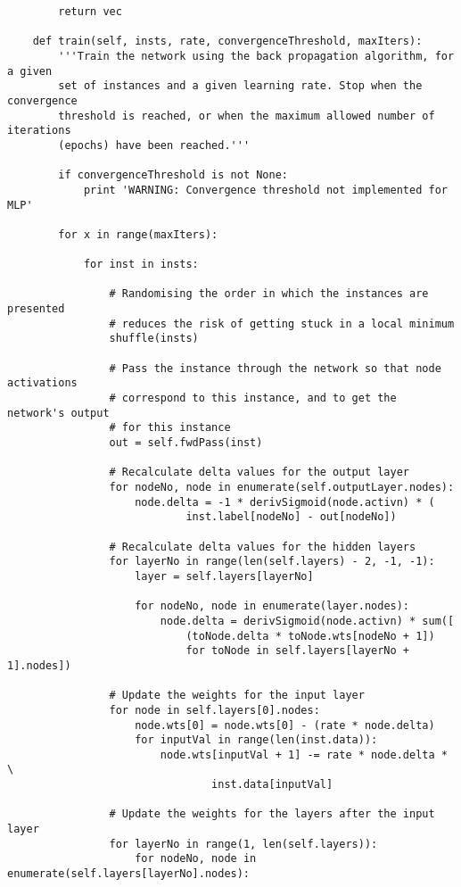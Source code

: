\documentclass{article}
\begin{document}
\begin{verbatim}
        return vec

    def train(self, insts, rate, convergenceThreshold, maxIters):
        '''Train the network using the back propagation algorithm, for a given
        set of instances and a given learning rate. Stop when the convergence
        threshold is reached, or when the maximum allowed number of iterations
        (epochs) have been reached.'''

        if convergenceThreshold is not None:
            print 'WARNING: Convergence threshold not implemented for MLP'

        for x in range(maxIters):
            
            for inst in insts:
                
                # Randomising the order in which the instances are presented 
                # reduces the risk of getting stuck in a local minimum
                shuffle(insts)

                # Pass the instance through the network so that node activations
                # correspond to this instance, and to get the network's output
                # for this instance
                out = self.fwdPass(inst)

                # Recalculate delta values for the output layer
                for nodeNo, node in enumerate(self.outputLayer.nodes):
                    node.delta = -1 * derivSigmoid(node.activn) * (
                            inst.label[nodeNo] - out[nodeNo])

                # Recalculate delta values for the hidden layers
                for layerNo in range(len(self.layers) - 2, -1, -1):
                    layer = self.layers[layerNo]

                    for nodeNo, node in enumerate(layer.nodes):
                        node.delta = derivSigmoid(node.activn) * sum([
                            (toNode.delta * toNode.wts[nodeNo + 1])
                            for toNode in self.layers[layerNo + 1].nodes])

                # Update the weights for the input layer
                for node in self.layers[0].nodes:
                    node.wts[0] = node.wts[0] - (rate * node.delta)
                    for inputVal in range(len(inst.data)):
                        node.wts[inputVal + 1] -= rate * node.delta * \
                                inst.data[inputVal]

                # Update the weights for the layers after the input layer
                for layerNo in range(1, len(self.layers)):
                    for nodeNo, node in enumerate(self.layers[layerNo].nodes):


\end{verbatim}
\end{document}
